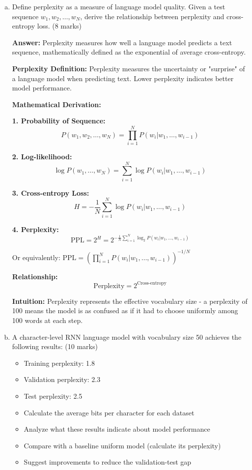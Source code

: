 \documentclass[12pt]{article}
\newcommand{\answer}[1]{{\color{answercolor}\textbf{Answer:} #1}}
\newcommand{\explanation}[1]{{\color{explanationcolor}#1}}
\begin{document}
\begin{enumerate}[(a)]
    \item Define perplexity as a measure of language model quality. Given a test sequence $w_1, w_2, \ldots, w_N$, derive the relationship between perplexity and cross-entropy loss. \hfill (8 marks)
    
    \answer{Perplexity measures how well a language model predicts a text sequence, mathematically defined as the exponential of average cross-entropy.}
    
    \explanation{
    \textbf{Perplexity Definition:}
    Perplexity measures the uncertainty or "surprise" of a language model when predicting text. Lower perplexity indicates better model performance.
    
    \textbf{Mathematical Derivation:}
    
    \textbf{1. Probability of Sequence:}
    $$P(w_1, w_2, \ldots, w_N) = \prod_{i=1}^N P(w_i | w_1, \ldots, w_{i-1})$$
    
    \textbf{2. Log-likelihood:}
    $$\log P(w_1, \ldots, w_N) = \sum_{i=1}^N \log P(w_i | w_1, \ldots, w_{i-1})$$
    
    \textbf{3. Cross-entropy Loss:}
    $$H = -\frac{1}{N} \sum_{i=1}^N \log P(w_i | w_1, \ldots, w_{i-1})$$
    
    \textbf{4. Perplexity:}
    $$\text{PPL} = 2^H = 2^{-\frac{1}{N} \sum_{i=1}^N \log_2 P(w_i | w_1, \ldots, w_{i-1})}$$
    
    Or equivalently: $\text{PPL} = \left(\prod_{i=1}^N P(w_i | w_1, \ldots, w_{i-1})\right)^{-1/N}$
    
    \textbf{Relationship:}
    $$\text{Perplexity} = 2^{\text{Cross-entropy}}$$
    
    \textbf{Intuition:} Perplexity represents the effective vocabulary size - a perplexity of 100 means the model is as confused as if it had to choose uniformly among 100 words at each step.
    }
    
    \item A character-level RNN language model with vocabulary size 50 achieves the following results: \hfill (10 marks)
    \begin{itemize}
        \item Training perplexity: 1.8
        \item Validation perplexity: 2.3
        \item Test perplexity: 2.5
    \end{itemize}
    
    \begin{itemize}
        \item Calculate the average bits per character for each dataset
        \item Analyze what these results indicate about model performance
        \item Compare with a baseline uniform model (calculate its perplexity)
        \item Suggest improvements to reduce the validation-test gap
    \end{itemize}
    

\end{enumerate}
\end{document}
